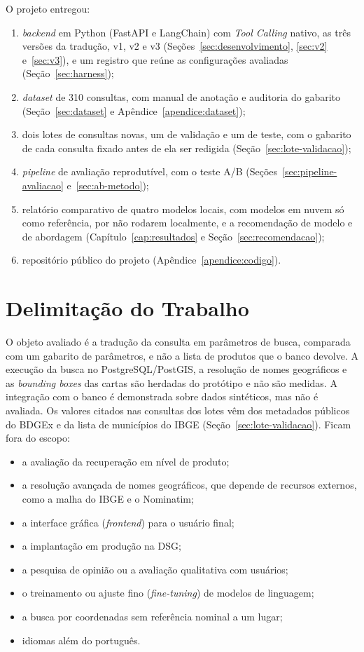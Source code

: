 O projeto entregou:
\begin{enumerate}
  \item \textit{backend} em Python (FastAPI e LangChain) com \textit{Tool Calling} nativo, as três versões da tradução, v1, v2 e v3 (Seções~\ref{sec:desenvolvimento}, \ref{sec:v2} e~\ref{sec:v3}), e um registro que reúne as configurações avaliadas (Seção~\ref{sec:harness});
  \item \textit{dataset} de 310 consultas, com manual de anotação e auditoria do gabarito (Seção~\ref{sec:dataset} e Apêndice~\ref{apendice:dataset});
  \item dois lotes de consultas novas, um de validação e um de teste, com o gabarito de cada consulta fixado antes de ela ser redigida (Seção~\ref{sec:lote-validacao});
  \item \textit{pipeline} de avaliação reprodutível, com o teste A/B (Seções~\ref{sec:pipeline-avaliacao} e~\ref{sec:ab-metodo});
  \item relatório comparativo de quatro modelos locais, com  modelos em nuvem só como referência, por não rodarem localmente, e a recomendação de modelo e de abordagem (Capítulo~\ref{cap:resultados} e Seção~\ref{sec:recomendacao});
  \item repositório público do projeto (Apêndice~\ref{apendice:codigo}).
\end{enumerate}

\section{Delimitação do Trabalho}
\label{sec:exclusoes-avaliacao}

O objeto avaliado é a tradução da consulta em parâmetros de busca, comparada com um gabarito de parâmetros, e não a lista de produtos que o banco devolve. A execução da busca no PostgreSQL/PostGIS, a resolução de nomes geográficos e as \textit{bounding boxes} das cartas são herdadas do protótipo e não são medidas. A integração com o banco é demonstrada sobre dados sintéticos, mas não é avaliada. Os valores citados nas consultas dos lotes vêm dos metadados públicos do BDGEx e da lista de municípios do IBGE (Seção~\ref{sec:lote-validacao}). Ficam fora do escopo:
\begin{itemize}
  \item a avaliação da recuperação em nível de produto;
  \item a resolução avançada de nomes geográficos, que depende de recursos externos, como a malha do IBGE e o Nominatim;
  \item a interface gráfica (\textit{frontend}) para o usuário final;
  \item a implantação em produção na DSG;
  \item a pesquisa de opinião ou a avaliação qualitativa com usuários;
  \item o treinamento ou ajuste fino (\textit{fine-tuning}) de modelos de linguagem;
  \item a busca por coordenadas sem referência nominal a um lugar;
  \item idiomas além do português.
\end{itemize}

